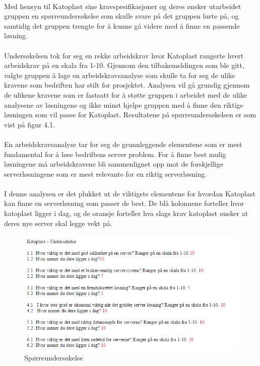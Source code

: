 \paragraph{} Med hensyn til Katoplast sine kravspesifikasjoner og deres ønsker utarbeidet gruppen en spørreundersøkelse som skulle svare på det gruppen lurte på, og samtidig det gruppen trengte for å kunne gå videre med å finne en passende løsning.

\paragraph{}Undersøkelsen tok for seg en rekke arbeidskrav hvor Katoplast rangerte hvert arbeidskrav på en skala fra 1-10. Gjennom den tilbakemeldingen som ble gitt, valgte gruppen å lage en arbeidskravsanalyse som skulle ta for seg de ulike kravene som bedriften har stilt for prosjektet. Analysen vil gå grundig gjennom de ulikene kravene som er fastsatt for å støtte gruppen i arbeidet med de ulike analysene av løsningene og ikke minst hjelpe gruppen med å finne den riktige løsningen som vil passe for Katoplast. Resultatene på spørreundersøkelsen er som vist på figur 4.1. 

\paragraph{} En arbeidskravsanalyse tar for seg de grunnleggende elementene som er mest fundamental for å løse bedriftens server problem. For å finne best mulig løsningene må arbeidskravene bli sammenlignet opp mot de forskjellige serverløsningene som er mest relevante for en riktig serverløsning.

\paragraph{}I denne analysen er det plukket ut de viktigste elementene for hvordan Katoplast kan finne en serverløsning som passer de best. De blå kolonnene forteller hvor katoplast ligger i dag, og de oransje forteller hva slags krav katoplast ønsker at deres nye server skal legge vekt på.

\begin{figure}[h] %
\centering
\includegraphics[width=6.5in]{Bilder/sporre.png}
\caption{Spørreundersøkelse}
\end{figure}

